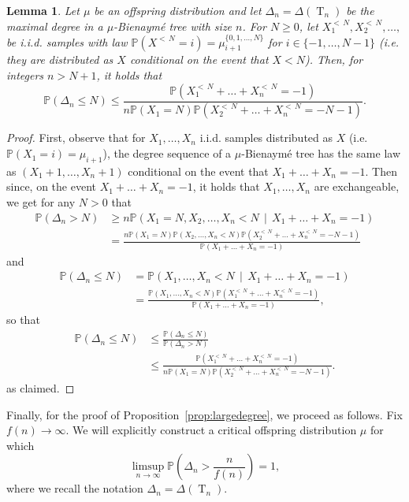 \documentclass[10pt]{amsart}
\newtheorem{lemm}[theo]{Lemma}\newtheorem{prop}[theo]{Proposition}\newtheorem{coro}[theo]{Corollary}\newtheorem{conj}[theo]{Conjecture}
\theoremstyle{definition}\newtheorem{defi}[theo]{Definition}\newtheorem{rema}[theo]{Remark}\newtheorem{exam}[theo]{Example}\newtheorem{exem}[theo]{Example}\newtheorem{nota}[theo]{Notation}
\renewcommand{\P}{\mathbb{P}}
\DeclareMathOperator{\rtree}{T}
\begin{document}
\begin{lemm}\label{lem:large_degree_is_large}
Let $\mu$ be an offspring distribution and let $\Delta_n=\Delta(\rtree_n)$ be the maximal degree in a $\mu$-Bienaymé tree with size $n$. For $N\geq 0$, let $X^{<\,N}_1,X^{<\,N}_2,\dots,$ be i.i.d. samples with law $\P(X^{<\,N}=i)=\mu^{\{0,1,\dots,N\}}_{i+1}$ for $i \in \{-1,\dots,N-1\}$ (i.e. they are distributed as $X$ conditional on the event that $X<N$). Then, for integers $n>N+1$, it holds that
\[
\P(\Delta_n\leq N) \leq \frac{ \P\left(X^{<\,N}_1+\dots+X^{<\,N}_n=-1\right)}{n \P(X_1=N)\P\left(X^{<\,N}_2+\dots+X^{<\,N}_n=-N-1\right)}.
\]
\end{lemm}
\begin{proof}
First, observe that for $X_1,\dots,X_n$ i.i.d. samples distributed as $X$ (i.e. $\P(X_1=i)=\mu_{i+1}$), the degree sequence of a $\mu$-Bienaymé tree has the same law as $(X_1+1,\dots,X_n+1)$ conditional on the event that $X_1+\dots+X_n=-1$. Then since, on the event $X_1+\dots+X_n=-1$, it holds that $X_1,\dots, X_n$ are exchangeable, we get for any $N>0$ that
\begin{align*}
\P(\Delta_n> N)&\geq n \P\left(X_1=N, X_2,\dots, X_n<N \,\middle|\, X_1+\dots+X_n=-1\right)\\
&= \frac{n \P(X_1=N)\P(X_2,\dots,X_n<N)\P\left(X^{<\,N}_2+\dots+X^{<\,N}_n=-N-1\right)}{\P(X_1+\dots+X_n=-1)}
\end{align*}
and
\begin{align*}
\P(\Delta_n\leq N)&= \P\left(X_1,\dots,X_n< N \,\middle| \,X_1+\dots+X_n=-1\right)\\
&= \frac{\P(X_1,\dots,X_n<N)\P\left(X^{<\,N}_1+\dots+X^{<\,N}_n=-1\right)}{\P(X_1+\dots+X_n=-1)},
\end{align*}
so that
\begin{align*}
\P(\Delta_n\leq N)&\leq \frac{\P(\Delta_n\leq N)}{\P(\Delta_n> N) } \\
&\leq \frac{ \P\left(X^{<\,N}_1+\dots+X^{<\,N}_n=-1\right)}{n \P(X_1=N)\P\left(X^{<\,N}_2+\dots+X^{<\,N}_n=-N-1\right)}.
\end{align*}
as claimed.
\end{proof}

Finally, for the proof of Proposition~\ref{prop:largedegree}, we proceed as follows. Fix $f(n)\to \infty$. We will explicitly construct a critical offspring distribution $\mu$ for which
\begin{equation}\label{eq:Delta}
\limsup_{n\to\infty}\P\left(\Delta_{n}>\frac{n}{f(n)}\right)=1,
\end{equation}
where we recall the notation $\Delta_n=\Delta(\rtree_n)$.
\end{document}
